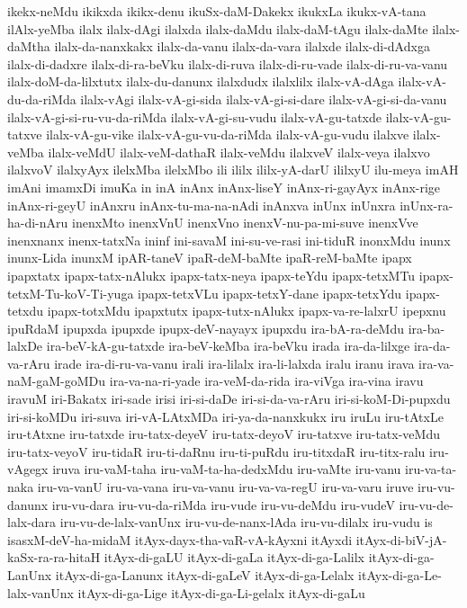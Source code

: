 {ikekx-neMdu
ikikxda
ikikx-denu
ikuSx-daM-Dakekx
ikukxLa
ikukx-vA-tana
ilAlx-yeMba
ilalx
ilalx-dAgi
ilalxda
ilalx-daMdu
ilalx-daM-tAgu
ilalx-daMte
ilalx-daMtha
ilalx-da-nanxkakx
ilalx-da-vanu
ilalx-da-vara
ilalxde
ilalx-di-dAdxga
ilalx-di-dadxre
ilalx-di-ra-beVku
ilalx-di-ruva
ilalx-di-ru-vade
ilalx-di-ru-va-vanu
ilalx-doM-da-lilxtutx
ilalx-du-danunx
ilalxdudx
ilalxlilx
ilalx-vA-dAga
ilalx-vA-du-da-riMda
ilalx-vAgi
ilalx-vA-gi-sida
ilalx-vA-gi-si-dare
ilalx-vA-gi-si-da-vanu
ilalx-vA-gi-si-ru-vu-da-riMda
ilalx-vA-gi-su-vudu
ilalx-vA-gu-tatxde
ilalx-vA-gu-tatxve
ilalx-vA-gu-vike
ilalx-vA-gu-vu-da-riMda
ilalx-vA-gu-vudu
ilalxve
ilalx-veMba
ilalx-veMdU
ilalx-veM-dathaR
ilalx-veMdu
ilalxveV
ilalx-veya
ilalxvo
ilalxvoV
ilalxyAyx
ilelxMba
ilelxMbo
ili
ililx
ililx-yA-darU
ililxyU
ilu-meya
imAH
imAni
imamxDi
imuKa
in
inA
inAnx
inAnx-liseY
inAnx-ri-gayAyx
inAnx-rige
inAnx-ri-geyU
inAnxru
inAnx-tu-ma-na-nAdi
inAnxva
inUnx
inUnxra
inUnx-ra-ha-di-nAru
inenxMto
inenxVnU
inenxVno
inenxV-nu-pa-mi-suve
inenxVve
inenxnanx
inenx-tatxNa
ininf
ini-savaM
ini-su-ve-rasi
ini-tiduR
inonxMdu
inunx
inunx-Lida
inunxM
ipAR-taneV
ipaR-deM-baMte
ipaR-reM-baMte
ipapx
ipapxtatx
ipapx-tatx-nAlukx
ipapx-tatx-neya
ipapx-teYdu
ipapx-tetxMTu
ipapx-tetxM-Tu-koV-Ti-yuga
ipapx-tetxVLu
ipapx-tetxY-dane
ipapx-tetxYdu
ipapx-tetxdu
ipapx-totxMdu
ipapxtutx
ipapx-tutx-nAlukx
ipapx-va-re-lalxrU
ipepxnu
ipuRdaM
ipupxda
ipupxde
ipupx-deV-nayayx
ipupxdu
ira-bA-ra-deMdu
ira-ba-lalxDe
ira-beV-kA-gu-tatxde
ira-beV-keMba
ira-beVku
irada
ira-da-lilxge
ira-da-va-rAru
irade
ira-di-ru-va-vanu
irali
ira-lilalx
ira-li-lalxda
iralu
iranu
irava
ira-va-naM-gaM-goMDu
ira-va-na-ri-yade
ira-veM-da-rida
ira-viVga
ira-vina
iravu
iravuM
iri-Bakatx
iri-sade
irisi
iri-si-daDe
iri-si-da-va-rAru
iri-si-koM-Di-pupxdu
iri-si-koMDu
iri-suva
iri-vA-LAtxMDa
iri-ya-da-nanxkukx
iru
iruLu
iru-tAtxLe
iru-tAtxne
iru-tatxde
iru-tatx-deyeV
iru-tatx-deyoV
iru-tatxve
iru-tatx-veMdu
iru-tatx-veyoV
iru-tidaR
iru-ti-daRnu
iru-ti-puRdu
iru-titxdaR
iru-titx-ralu
iru-vAgegx
iruva
iru-vaM-taha
iru-vaM-ta-ha-dedxMdu
iru-vaMte
iru-vanu
iru-va-ta-naka
iru-va-vanU
iru-va-vana
iru-va-vanu
iru-va-va-regU
iru-va-varu
iruve
iru-vu-danunx
iru-vu-dara
iru-vu-da-riMda
iru-vude
iru-vu-deMdu
iru-vudeV
iru-vu-de-lalx-dara
iru-vu-de-lalx-vanUnx
iru-vu-de-nanx-lAda
iru-vu-dilalx
iru-vudu
is
isasxM-deV-ha-midaM
itAyx-dayx-tha-vaR-vA-kAyxni
itAyxdi
itAyx-di-biV-jA-kaSx-ra-ra-hitaH
itAyx-di-gaLU
itAyx-di-gaLa
itAyx-di-ga-Lalilx
itAyx-di-ga-LanUnx
itAyx-di-ga-Lanunx
itAyx-di-gaLeV
itAyx-di-ga-Lelalx
itAyx-di-ga-Le-lalx-vanUnx
itAyx-di-ga-Lige
itAyx-di-ga-Li-gelalx
itAyx-di-gaLu
}
